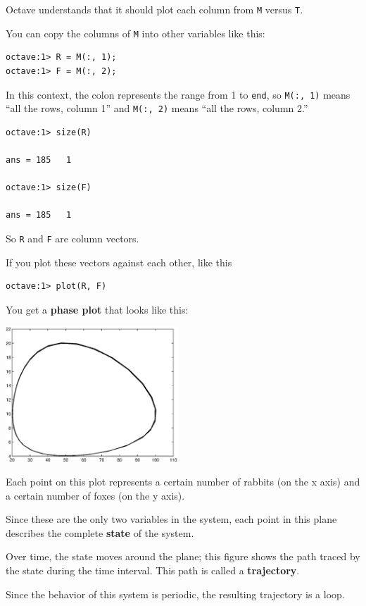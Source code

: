 Octave understands that it should plot each column from {\tt M}
versus {\tt T}.

You can copy the columns of {\tt M} into other variables like
this:

\begin{verbatim}
octave:1> R = M(:, 1);
octave:1> F = M(:, 2);
\end{verbatim}

In this context, the colon represents the range from 1 to {\tt end},
so {\tt M(:, 1)} means ``all the rows, column 1'' and
{\tt M(:, 2)} means ``all the rows, column 2.''

\begin{verbatim}
octave:1> size(R)

ans = 185   1

octave:1> size(F)

ans = 185   1
\end{verbatim}

So {\tt R} and {\tt F} are column vectors. 


If you plot these
vectors against each other, like this

\begin{verbatim}
octave:1> plot(R, F)
\end{verbatim}

You get a {\bf phase plot} that looks like this:

\beforefig \centerline{\includegraphics[height=2in]{figs/phase.eps}}

Each point on this plot represents a certain number of rabbits (on the
x axis) and a certain number of foxes (on the y axis).

Since these are the only two variables in the system, each point in
this plane describes the complete {\bf state} of the system.

Over time, the state moves around the plane; this figure shows
the path traced by the state during the time interval. This path
is called a {\bf trajectory}.

Since the behavior of this system is periodic, the resulting
trajectory is a loop.

